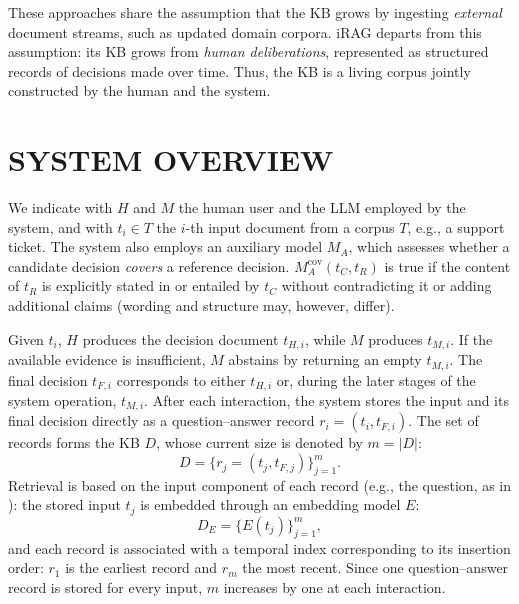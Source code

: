 \documentclass[a4paper,twoside]{article}
\begin{document}
These approaches share the assumption that the KB grows by ingesting \textit{external} document streams, such as updated domain corpora. iRAG departs from this assumption: its KB grows from \textit{human deliberations}, represented as structured records of decisions made over time. %
Thus, the KB is a living corpus jointly constructed by the human and the system.

\section{\uppercase{System Overview}}
\label{sec:model}

We indicate with $H$ and $M$ the human user and the LLM employed by the system, and with $t_i \in T$ the $i$-th input document from a corpus $T$, e.g., a support ticket. The system also employs an auxiliary model $M_A$, which assesses whether a candidate decision \emph{covers} a reference decision. $M_A^{\mathrm{cov}}(t_C,t_R)$ is true if the content of $t_R$ is explicitly stated in or entailed by $t_C$ without contradicting it or adding additional claims (wording and structure may, however, differ).

Given $t_i$, $H$ produces the decision document $t_{H,i}$, while $M$ produces $t_{M,i}$. If the available evidence is insufficient, $M$ abstains by returning an empty $t_{M,i}$. The final decision $t_{F,i}$ corresponds to either $t_{H,i}$ or, during the later stages of the system operation, $t_{M,i}$. After each interaction, the system stores the input and its final decision directly as a question--answer record $r_i=(t_i,t_{F,i})$. The set of records forms the KB $D$, whose current size is denoted by $m=|D|$:
\begin{equation}
D=\{r_j=(t_j,t_{F,j})\}_{j=1}^{m}.
\end{equation}
Retrieval is based on the input component of each record (e.g., the question, as in \cite{lewis2021paq}): the stored input $t_j$ is embedded through an embedding model $E$:
\begin{equation}
D_E=\{E(t_j)\}_{j=1}^{m},
\end{equation}
and each record is associated with a temporal index corresponding to its insertion order: $r_1$ is the earliest record and $r_m$ the most recent. Since one question--answer record is stored for every input, $m$ increases by one at each interaction.
\end{document}
